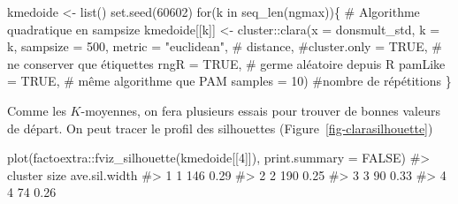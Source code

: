 \documentclass[
  11pt,
  letterpaper,
]{scrbook}
\newenvironment{Shaded}{\begin{snugshade}}{\end{snugshade}}
\newcommand{\AttributeTok}[1]{\textcolor[rgb]{0.40,0.45,0.13}{#1}}
\newcommand{\CommentTok}[1]{\textcolor[rgb]{0.37,0.37,0.37}{#1}}
\newcommand{\ConstantTok}[1]{\textcolor[rgb]{0.56,0.35,0.01}{#1}}
\newcommand{\ControlFlowTok}[1]{\textcolor[rgb]{0.00,0.23,0.31}{#1}}
\newcommand{\DecValTok}[1]{\textcolor[rgb]{0.68,0.00,0.00}{#1}}
\newcommand{\FunctionTok}[1]{\textcolor[rgb]{0.28,0.35,0.67}{#1}}
\newcommand{\NormalTok}[1]{\textcolor[rgb]{0.00,0.23,0.31}{#1}}
\newcommand{\OtherTok}[1]{\textcolor[rgb]{0.00,0.23,0.31}{#1}}
\newcommand{\SpecialCharTok}[1]{\textcolor[rgb]{0.37,0.37,0.37}{#1}}
\newcommand{\StringTok}[1]{\textcolor[rgb]{0.13,0.47,0.30}{#1}}
\theoremstyle{definition}
\theoremstyle{remark}
\begin{document}
\begin{Shaded}
\begin{Highlighting}[]
\NormalTok{kmedoide }\OtherTok{\textless{}{-}} \FunctionTok{list}\NormalTok{()}
\FunctionTok{set.seed}\NormalTok{(}\DecValTok{60602}\NormalTok{)}
\ControlFlowTok{for}\NormalTok{(k }\ControlFlowTok{in} \FunctionTok{seq\_len}\NormalTok{(ngmax))\{}
  \CommentTok{\# Algorithme quadratique en sampsize}
\NormalTok{kmedoide[[k]] }\OtherTok{\textless{}{-}}\NormalTok{ cluster}\SpecialCharTok{::}\FunctionTok{clara}\NormalTok{(}\AttributeTok{x =}\NormalTok{ donsmult\_std,}
               \AttributeTok{k =}\NormalTok{ k,}
               \AttributeTok{sampsize =} \DecValTok{500}\NormalTok{,}
               \AttributeTok{metric =} \StringTok{"euclidean"}\NormalTok{, }\CommentTok{\# distance,}
               \CommentTok{\#cluster.only = TRUE, \# ne conserver que étiquettes}
               \AttributeTok{rngR =} \ConstantTok{TRUE}\NormalTok{, }\CommentTok{\# germe aléatoire depuis R}
               \AttributeTok{pamLike =} \ConstantTok{TRUE}\NormalTok{, }\CommentTok{\# même algorithme que PAM}
               \AttributeTok{samples =} \DecValTok{10}\NormalTok{) }\CommentTok{\#nombre de répétitions}
\NormalTok{\}}
\end{Highlighting}
\end{Shaded}

Comme les \(K\)-moyennes, on fera plusieurs essais pour trouver de
bonnes valeurs de départ. On peut tracer le profil des silhouettes
(Figure~\ref{fig-clarasilhouette})

\begin{Shaded}
\begin{Highlighting}[]
\FunctionTok{plot}\NormalTok{(factoextra}\SpecialCharTok{::}\FunctionTok{fviz\_silhouette}\NormalTok{(kmedoide[[}\DecValTok{4}\NormalTok{]]),}
     \AttributeTok{print.summary =} \ConstantTok{FALSE}\NormalTok{)}
\CommentTok{\#\textgreater{}   cluster size ave.sil.width}
\CommentTok{\#\textgreater{} 1       1  146          0.29}
\CommentTok{\#\textgreater{} 2       2  190          0.25}
\CommentTok{\#\textgreater{} 3       3   90          0.33}
\CommentTok{\#\textgreater{} 4       4   74          0.26}
\end{Highlighting}
\end{Shaded}
\end{document}
